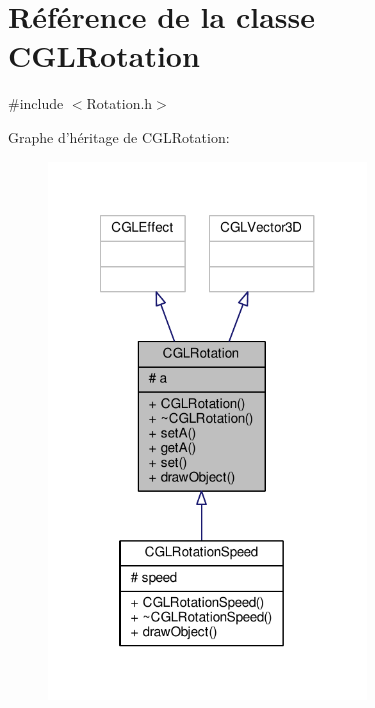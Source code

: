 \hypertarget{class_c_g_l_rotation}{\section{Référence de la classe C\-G\-L\-Rotation}
\label{class_c_g_l_rotation}
}


{\ttfamily \#include $<$Rotation.\-h$>$}



Graphe d'héritage de C\-G\-L\-Rotation\-:
\nopagebreak
\begin{figure}[H]
\begin{center}
\leavevmode
\includegraphics[width=239pt]{d4/d97/class_c_g_l_rotation__inherit__graph}
\end{center}
\end{figure}


